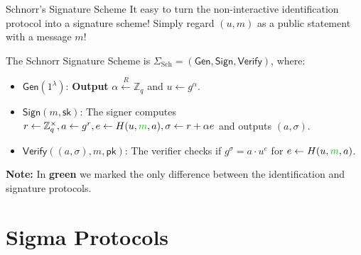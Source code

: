 \documentclass[xcolor={usenames,dvipsnames}]{beamer}
\begin{document}
    \begin{frame}{Schnorr's Signature Scheme}
        It easy to turn the non-interactive identification protocol into a signature scheme! Simply regard $(u,m)$ as a public statement with a message $m$!

        \begin{definition}
            The Schnorr Signature Scheme is $\Sigma_{\text{Sch}} = (\mathsf{Gen}, \mathsf{Sign}, \mathsf{Verify})$, where:
            \begin{itemize}
                \item $\mathsf{Gen}(1^{\lambda})$: \textbf{Output} $\alpha \xleftarrow{R} \mathbb{Z}_q$ and $u \gets g^{\alpha}$.
                \item $\mathsf{Sign}(m,\mathsf{sk})$: The signer computes $r \gets \mathbb{Z}_q^{\times}, a \gets g^{r}, e \gets H(u, \textcolor{green!80!black}{m}, a), \sigma \gets r + \alpha e$ and outputs $(a,\sigma)$.
                \item $\mathsf{Verify}((a, \sigma), m,\mathsf{pk})$: The verifier checks if $g^{\sigma} = a \cdot u^e$ for $e \gets H(u, \textcolor{green!80!black}{m}, a)$.
            \end{itemize}
        \end{definition}

        \textbf{Note:} In \textcolor{green!80!black}{\textbf{green}} we marked the only difference between the identification and signature protocols.
    \end{frame}

    \section{Sigma Protocols}
    
\end{document}
